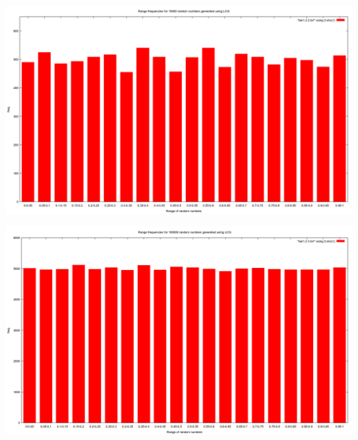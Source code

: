 \documentclass{article}
\begin{document}
\includegraphics[scale=0.3]{"bar1_2_2"}

\includegraphics[scale=0.3]{"bar1_2_3"}
\pagebreak
\end{document}
